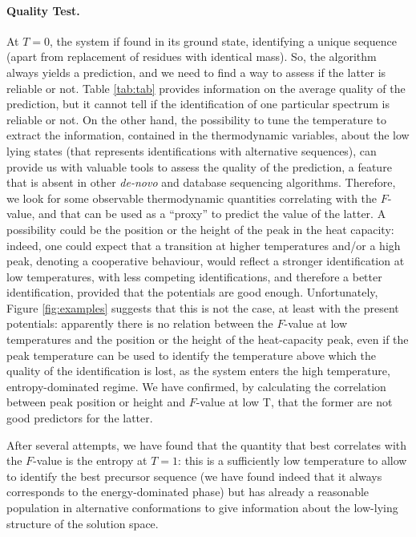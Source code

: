 \paragraph{Quality Test.}
At $T=0$, the system if found in its ground state, identifying a unique sequence
(apart from replacement of residues with identical mass). So, the algorithm
always yields a prediction, and we need to find a way to assess if the latter is
reliable or not. Table \ref{tab:tab} provides information on the average quality
of the prediction, but it cannot tell if the identification of one particular
spectrum is reliable or not.
On the other hand, the possibility to tune the temperature to extract the
information, contained in the thermodynamic variables, about the low lying
states (that represents identifications with alternative sequences), can provide
us with valuable tools to assess the quality of the prediction, a feature that
is absent in  other \emph{de-novo} and database sequencing algorithms.
Therefore, we look for some observable thermodynamic quantities correlating with
the $F$-value, and that can be used as a ``proxy'' to predict the value of the latter.
A possibility could be the position or the height of the peak in the heat
capacity: indeed, one could expect that a transition at higher temperatures
and/or a high peak, denoting a cooperative behaviour, would reflect a stronger
identification at low temperatures, with less competing identifications, and
therefore a better identification, provided that the potentials are good enough.
Unfortunately, Figure \ref{fig:examples} suggests that this is not the case, at
least with the present potentials: apparently there is no relation between the
$F$-value at low temperatures and the  position or the height of the
heat-capacity peak, even if the peak temperature can be used to identify the
temperature above which the quality of the identification is lost, as the system
enters the high temperature, entropy-dominated regime. We have confirmed, by
calculating the correlation between peak position or height and $F$-value at low
T, that the former are not good predictors for the latter.

After several attempts, we have found that the quantity that best correlates
with the $F$-value is the entropy at $T=1$: this is a sufficiently low
temperature to allow to identify the best precursor sequence (we have found
indeed that it always corresponds to the energy-dominated phase) but has already
a reasonable population in alternative conformations to give information about
the low-lying structure of the solution space.

